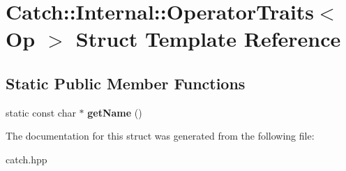 \hypertarget{structCatch_1_1Internal_1_1OperatorTraits}{}\section{Catch\+:\+:Internal\+:\+:Operator\+Traits$<$ Op $>$ Struct Template Reference}
\label{structCatch_1_1Internal_1_1OperatorTraits}
\subsection*{Static Public Member Functions}
\begin{DoxyCompactItemize}
\item 
static const char $\ast$ {\bfseries get\+Name} ()\hypertarget{structCatch_1_1Internal_1_1OperatorTraits_ac6d08082ea33348d42bc4ccbd6d07671}{}\label{structCatch_1_1Internal_1_1OperatorTraits_ac6d08082ea33348d42bc4ccbd6d07671}

\end{DoxyCompactItemize}


The documentation for this struct was generated from the following file\+:\begin{DoxyCompactItemize}
\item 
catch.\+hpp\end{DoxyCompactItemize}
